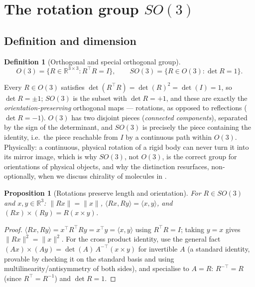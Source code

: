 \documentclass[11pt,a4paper]{report}
\newtheorem{proposition}[proposition]{Proposition}
\theoremstyle{definition}
\newtheorem{definition}[definition]{Definition}
\theoremstyle{remark}
\newcommand{\RR}{\mathbb R}
\begin{document}
\section{The rotation group $SO(3)$}
\label{sec:so3-scratch}

\subsection{Definition and dimension}

\begin{definition}[Orthogonal and special orthogonal group]
\label{def:so3-def}
\[
O(3) = \{R\in\RR^{3\times3} : R^\top R = I\},
\qquad
SO(3) = \{R\in O(3) : \det R = 1\} .
\]
\end{definition}

Every $R\in O(3)$ satisfies $\det(R^\top R)=\det(R)^2=\det(I)=1$, so
$\det R=\pm1$; $SO(3)$ is the subset with $\det R=+1$, and these are exactly
the \emph{orientation-preserving} orthogonal maps --- rotations, as opposed
to reflections ($\det R=-1$). $O(3)$ has two disjoint pieces (\emph{connected
components}), separated by the sign of the determinant, and $SO(3)$ is
precisely the piece containing the identity, i.e.\ the piece reachable from
$I$ by a continuous path within $O(3)$. Physically: a continuous, physical
rotation of a rigid body can never turn it into its mirror image, which is
why $SO(3)$, not $O(3)$, is the correct group for orientations of physical
objects, and why the distinction resurfaces, non-optionally, when we discuss
chirality of molecules in .

\begin{proposition}[Rotations preserve length and orientation]
\label{prop:so3-isometry}
For $R\in SO(3)$ and $x,y\in\RR^3$: $\|Rx\|=\|x\|$, $\langle Rx,Ry\rangle=\langle x,y\rangle$,
and $(Rx)\times(Ry)=R(x\times y)$.
\end{proposition}

\begin{proof}
$\langle Rx,Ry\rangle = x^\top R^\top R y = x^\top y=\langle x,y\rangle$
using $R^\top R=I$; taking $y=x$ gives $\|Rx\|^2=\|x\|^2$. For the cross
product identity, use the general fact $(Ax)\times(Ay)=\det(A)\,A^{-\top}(x\times y)$
for invertible $A$ (a standard identity, provable by checking it on the
standard basis and using multilinearity/antisymmetry of both sides), and
specialise to $A=R$: $R^{-\top}=R$ (since $R^\top=R^{-1}$) and $\det R=1$.
\end{proof}
\end{document}
